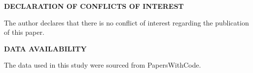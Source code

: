 \documentclass{article}
\begin{document}
\newpage

\begin{center}
\Large\textbf{DECLARATION OF CONFLICTS OF INTEREST}
\end{center}

\vspace{1em} %

The author declares that there is no conflict of interest regarding the publication of this paper.

\newpage

\begin{center}
\Large\textbf{DATA AVAILABILITY}
\end{center}

\vspace{1em} %

The data used in this study were sourced from PapersWithCode.

\nocite{*}

\end{document}
